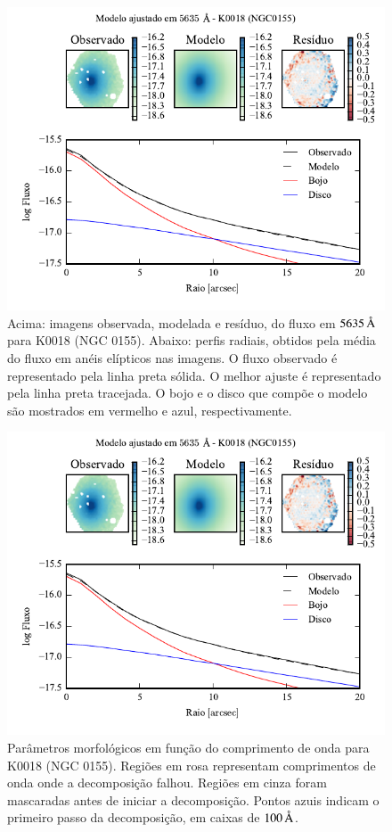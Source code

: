 \begin{figure}
	\includegraphics[page=1]{figuras-decomp/K0018_sample006a}
	\caption[Ajuste morfológico em $5635\,\angstrom$ de K0018 (NGC 0155)]
	{Acima: imagens observada, modelada e resíduo, do fluxo em $5635\,\angstrom$
	para K0018 (NGC 0155). Abaixo: perfis radiais, obtidos pela média do fluxo em
	anéis elípticos nas imagens. O fluxo observado é representado pela linha preta
	sólida. O melhor ajuste é representado pela linha preta tracejada. O bojo e o
	disco que compõe o modelo são mostrados em vermelho e azul, respectivamente.}
	\label{fig:decompRadprof:K0018}
\end{figure}

\begin{figure}
	\includegraphics[page=2]{figuras-decomp/K0018_sample006a}
	\caption[Parâmetros morfológicos em função do comprimento de onda de K0018
	(NGC 0155)]
	{Parâmetros morfológicos em função do comprimento de onda para
	K0018 (NGC 0155). Regiões em rosa representam comprimentos de onda onde a
	decomposição falhou. Regiões em cinza foram mascaradas antes de iniciar a
	decomposição. Pontos azuis indicam o primeiro passo da decomposição, em caixas
	de $100\,\text{\normalfont\AA}$.}
	\label{fig:decompParams:K0018}
\end{figure}

